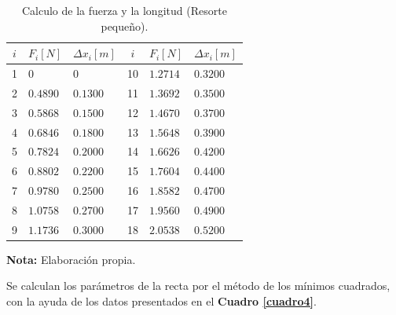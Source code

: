 \documentclass[letter,11pt]{article}
\newcommand{\source}[1]{\vspace{-11pt} \caption*{\small{\textbf{Nota:} {#1}}}}
\begin{document}
\begin{table}[!h]
\begin{center}
\begin{tabular}{|c||>{\centering}m{2.0cm}<{\centering}
                  |>{\centering}m{2.0cm}<{\centering}|
                |c||>{\centering}m{2.0cm}<{\centering}
                  |>{\centering}m{2.0cm}<{\centering}|}
\hline
$i$ & $F_i [N]$ & $\Delta x_i [m]$ & $i$ & $F_i [N]$ & $\Delta x_i [m]$
    \tabularnewline \hline \hline
 1 & $     0$ & $     0$ & 10 & $1.2714$ & $0.3200$\tabularnewline \hline
 2 & $0.4890$ & $0.1300$ & 11 & $1.3692$ & $0.3500$\tabularnewline \hline
 3 & $0.5868$ & $0.1500$ & 12 & $1.4670$ & $0.3700$\tabularnewline \hline
 4 & $0.6846$ & $0.1800$ & 13 & $1.5648$ & $0.3900$\tabularnewline \hline
 5 & $0.7824$ & $0.2000$ & 14 & $1.6626$ & $0.4200$\tabularnewline \hline
 6 & $0.8802$ & $0.2200$ & 15 & $1.7604$ & $0.4400$\tabularnewline \hline
 7 & $0.9780$ & $0.2500$ & 16 & $1.8582$ & $0.4700$\tabularnewline \hline
 8 & $1.0758$ & $0.2700$ & 17 & $1.9560$ & $0.4900$\tabularnewline \hline
 9 & $1.1736$ & $0.3000$ & 18 & $2.0538$ & $0.5200$\tabularnewline \hline
\end{tabular}
\caption{Calculo de la fuerza y la longitud (Resorte pequeño).}
\label{cuadro3}
\source{Elaboración propia.}
\end{center}
\end{table}

Se calculan los parámetros de la recta por el método de los mínimos cuadrados,
con la ayuda de los datos presentados en el \textbf{Cuadro \ref{cuadro4}}.
\end{document}
